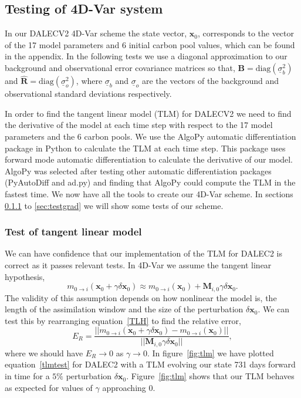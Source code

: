 \documentclass[11pt]{article}
\begin{document}
\subsection{Testing of 4D-Var system}

In our DALECV2 4D-Var scheme the state vector, $\textbf{x}_0$, corresponds to the vector of the 17 model parameters and 6 initial carbon pool values, which can be found in the appendix. In the following tests we use a diagonal approximation to our background and observational error covariance matrices so that, 
$\textbf{B}=\text{diag}(\underline{\sigma}_b^2)$ and $\hat{\textbf{R}}=\text{diag}(\underline{\sigma}_o^2 )$,
where $\underline{\sigma}_b$ and $\underline{\sigma}_o$ are the vectors of the background and observational standard deviations respectively.

In order to find the tangent linear model (TLM) for DALECV2 we need to find the derivative of the model at each time step with respect to the 17 model parameters and the 6 carbon pools. We use the AlgoPy automatic differentiation package in Python to calculate the TLM at each time step. This package uses forward mode automatic differentiation to calculate the derivative of our model. AlgoPy was selected after testing other automatic differentiation packages (PyAutoDiff and ad.py) and finding that AlgoPy could compute the TLM in the fastest time. We now have all the tools to create our 4D-Var scheme. In sections \ref{sec:testtlm} to \ref{sec:testgrad} we will show some tests of our scheme.

\subsubsection{Test of tangent linear model} \label{sec:testtlm}

We can have confidence that our implementation of the TLM for DALEC2 is correct as it passes relevant tests. In 4D-Var we assume the tangent linear hypothesis,
\begin{equation}
m_{0\rightarrow i}(\mathbf{x}_0+\gamma \delta\mathbf{x}_0) \approx m_{0 \rightarrow i}(\mathbf{x}_0) + \mathbf{M}_{i,0}\gamma \delta\mathbf{x}_0. \label{TLH}
\end{equation}
The validity of this assumption depends on how nonlinear the model is, the length of the assimilation window and the size of the perturbation $\delta\mathbf{x}_0$. We can test this by rearranging equation~\ref{TLH} to find the relative error,
\begin{equation}
E_R=\frac{||m_{0\rightarrow i}(\mathbf{x}_0+\gamma \delta\mathbf{x}_0) - m_{0 \rightarrow i}(\mathbf{x}_0)||}{||\mathbf{M}_{i,0}\gamma\delta\mathbf{x}_0||}, \label{tlmtest}
\end{equation}
where we should have $E_R \rightarrow 0$ as $\gamma \rightarrow 0$. In figure~\ref{fig:tlm} we have plotted equation~\ref{tlmtest} for DALEC2 with a TLM evolving our state 731 days forward in time for a $5\%$ perturbation $\delta \textbf{x}_0$. Figure~\ref{fig:tlm} shows that our TLM behaves as expected for values of $\gamma$ approaching $0$.
\end{document}
